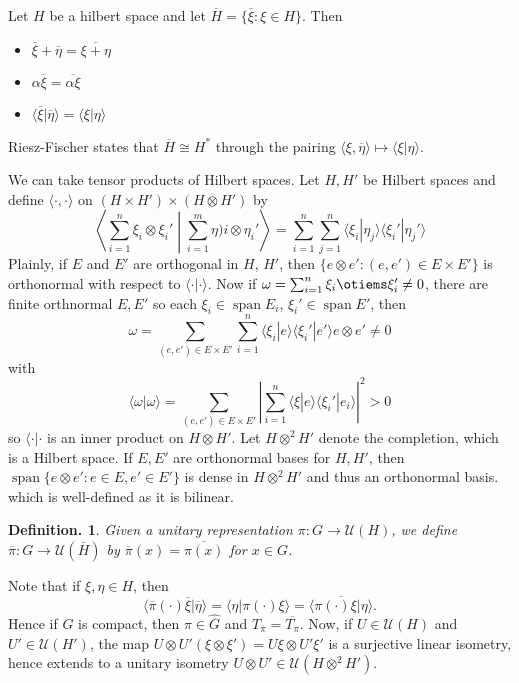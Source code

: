\documentclass[11pt, a4paper]{memoir}
\newcommand{\ol}[1]{\ensuremath{\overline{#1}}}
\theoremstyle{change}
\theoremstyle{plain}
\theoremstyle{nonumberplain}
\newtheorem{definition}{Definition.}
\DeclareMathOperator{\spn}{span}
\numberwithin{equation}{section}
\begin{document}
Let $H$ be a hilbert space and let $\overline{H}=\{\overline{\xi}:\xi\in H\}$.
Then
\begin{itemize}[nl]
    \item $\overline{\xi}+\overline{\eta}=\overline{\xi+\eta}$
    \item $\alpha\overline{\xi}=\overline{\alpha\xi}$
    \item $\langle\ol{\xi}|\ol{\eta}\rangle=\langle\xi|\eta\rangle$
\end{itemize}
Riesz-Fischer states that $\overline{H}\cong H^*$ through the pairing $\langle\xi,\overline{\eta}\rangle\mapsto\langle\xi|\eta\rangle$.

We can take tensor products of Hilbert spaces.
Let $H,H'$ be Hilbert spaces and define $\langle\cdot,\cdot\rangle$ on $(H\times H')\times(H\otimes H')$ by
\begin{equation*}
    \left\langle\sum_{i=1}^n\xi_i\otimes\xi_i'\middle|\sum_{i=1}^m\eta)i\otimes\eta_i'\right\rangle=\sum_{i=1}^n\sum_{j=1}^n\langle\xi_i|\eta_j\rangle\langle\xi_i'|\eta_j'\rangle
\end{equation*}
Plainly, if $E$ and $E'$ are orthogonal in $H$, $H'$, then $\{e\otimes e':(e,e')\in E\times E'\}$ is orthonormal with respect to $\langle\cdot|\cdot\rangle$.
Now if $\omega=\sum_{i=1}^n\xi_i\otiems\xi_i'\neq 0$, there are finite orthnormal $E,E'$ so each $\xi_i\in\spn E_i$, $\xi_i'\in\spn E'$, then
\begin{equation*}
    \omega=\sum_{(e,e')\in E\times E'}\sum_{i=1}^n\langle\xi_i|e\rangle\langle\xi_i'|e'\rangle e\otimes e'\neq 0
\end{equation*}
with
\begin{equation*}
    \langle\omega|\omega\rangle=\sum_{(e,e')\in E\times E'}\left\lvert\sum_{i=1}^n\langle\xi|e\rangle\langle\xi_i'|e_i\rangle\right\rvert^2>0
\end{equation*}
so $\langle\cdot|\cdot$ is an inner product on $H\otimes H'$.
Let $H\otimes^2 H'$ denote the completion, which is a Hilbert space.
If $E,E'$ are orthonormal bases for $H,H'$, then $\spn\{e\otimes e':e\in E,e'\in E'\}$ is dense in $H\otimes^2 H'$ and thus an orthonormal basis.
which is well-defined as it is bilinear.
\begin{definition}
    Given a unitary representation $\pi:G\to\mathcal{U}(H)$, we define $\overline{\pi}:G\to\mathcal{U}(\overline{H})$ by $\overline{\pi}(x)=\overline{\pi(x)}$ for $x\in G$.
\end{definition}
Note that if $\xi,\eta\in H$, then
\begin{equation*}
    \langle\overline{\pi}(\cdot)\overline{\xi}|\overline{\eta}\rangle=\langle\eta|\pi(\cdot)\xi\rangle=\overline{\langle\pi(\cdot)\xi|\eta\rangle}.
\end{equation*}
Hence if $G$ is compact, then $\pi\in\widehat{G}$ and $T_{\overline{\pi}}=\overline{T_\pi}$.
Now, if $U\in\mathcal{U}(H)$ and $U'\in\mathcal{U}(H')$, the map $U\otimes U'(\xi\otimes\xi')=U\xi\otimes U'\xi'$ is a surjective linear isometry, hence extends to a unitary isometry $U\otimes U'\in\mathcal{U}(H\otimes^2 H')$.
\end{document}
